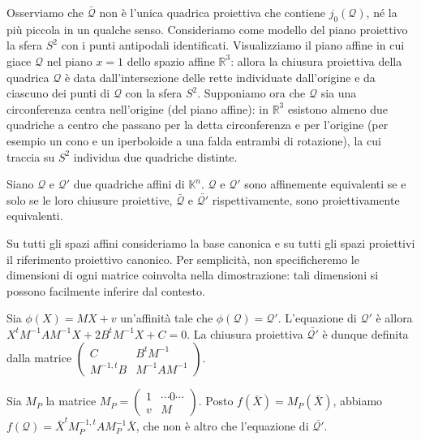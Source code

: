 	\par Osserviamo che $\bar{\mathcal{Q}}$ non \`e l'unica quadrica proiettiva che contiene $j_0(\mathcal{Q})$, n\'e la pi\`u piccola in un qualche senso. Consideriamo come modello del piano proiettivo la sfera $S^2$ con i punti antipodali identificati. Visualizziamo il piano affine in cui giace $\mathcal{Q}$ nel piano $x = 1$ dello spazio affine $\mathbb{R}^3$: allora la chiusura proiettiva della quadrica $\mathcal{Q}$ \`e data dall'intersezione delle rette individuate dall'origine e da ciascuno dei punti di $\mathcal{Q}$ con la sfera $S^2$. Supponiamo ora che $\mathcal{Q}$ sia una circonferenza centra nell'origine (del piano affine): in $\mathbb{R}^3$ esistono almeno due quadriche a centro che passano per la detta circonferenza e per l'origine (per esempio un cono e un iperboloide a una falda entrambi di rotazione), la cui traccia su $S^2$ individua due quadriche distinte.
\begin{Theorem}\label{th74}
	Siano $\mathcal{Q}$ e $\mathcal{Q}'$ due quadriche affini di $\mathbb{K}^n$. $\mathcal{Q}$ e $\mathcal{Q}'$ sono affinemente equivalenti se e solo se le loro chiusure proiettive, $\bar{\mathcal{Q}}$ e $\bar{\mathcal{Q}'}$ rispettivamente, sono proiettivamente equivalenti.
\end{Theorem}
\Proof Su tutti gli spazi affini consideriamo la base canonica e su tutti gli spazi proiettivi il riferimento proiettivo canonico. Per semplicit\`a, non specificheremo le dimensioni di ogni matrice coinvolta nella dimostrazione: tali dimensioni si possono facilmente inferire dal contesto.
\par Sia $\phi(X) = MX + v$ un'affinit\`a tale che $\phi(\mathcal{Q}) = \mathcal{Q}'$. L'equazione di $\mathcal{Q}'$ \`e allora $X^tM^{-1}AM^{-1}X + 2B^tM^{-1}X + C = 0$. La chiusura proiettiva $\bar{\mathcal{Q}'}$ \`e dunque definita dalla matrice $\left ( \begin{array}{c|c} C & B^tM^{-1}\\\hline M^{-1,t}B & M^{-1}AM^{-1} \end{array} \right )$.
\par Sia $M_P$ la matrice $M_P = \left ( \begin{array}{c|c} 1 & \cdots 0 \cdots\\\hline v & M \end{array} \right )$. Posto $f(\bar{X}) = M_P(\bar{X})$, abbiamo $f(\mathcal{Q}) = \bar{X}^tM_P^{-1,t}AM_P^{-1}\bar{X}$, che non \`e altro che l'equazione di $\bar{\mathcal{Q}'}$.\EndProof
